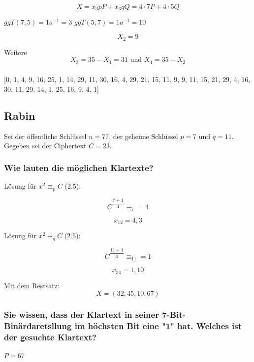 \begin{equation}
	X = x_3 p P + x_3 q Q = 4 \cdot 7 P + 4 \cdot 5 Q
\end{equation}

$ggT(7,5)=1 a^{-1} = 3$
$ggT(5,7)=1 a^{-1} = 10$

\[	X_2 = 9\]

Weitere \[X_3 = 35-X_1 = 31 \text{ und } X_4 = 35-X_2 \]

\subsubsection{}
[0, 1, 4, 9, 16, 25, 1, 14, 29, 11, 30, 16, 4, 29, 21, 15, 11, 9, 9, 11, 15, 21, 29, 4, 16, 30, 11, 29, 14, 1, 25, 16, 9, 4, 1]

\subsection{Rabin}

Sei der öffentliche Schlüssel $n=77$, der geheime Schlüssel $p=7$ und $q=11$.
Gegeben sei der Ciphertext $C = 23$.



\subsubsection{Wie lauten die möglichen Klartexte?}


Lösung für $x^2 \equiv_p C$ (2.5):    

\begin{equation}
	C^{\dfrac{7+1}{4}} \equiv_7 = 4
\end{equation}

\[ x_{12} = 4,3 \]

Lösung für $x^2 \equiv_q C$ (2.5):    

\begin{equation}
	C^{\dfrac{11+1}{4}} \equiv_11 = 1
\end{equation}



\[ x_{34} = 1,10 \]

Mit dem Restsatz: \[X = (32,45,10,67)\]

\subsubsection{Sie wissen, dass der Klartext in seiner 7-Bit-Binärdaretsllung im höchsten Bit
eine "1" hat. Welches ist der gesuchte Klartext?}

$P=67$

